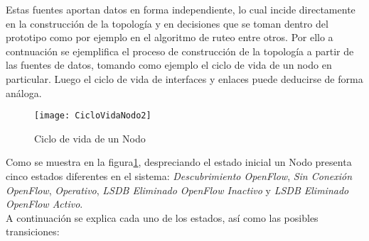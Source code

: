 Estas fuentes aportan datos en forma independiente, lo cual incide directamente en la construcci\'on de la topolog\'ia y en decisiones que se toman dentro del prototipo como por ejemplo en el algoritmo de ruteo entre otros. Por ello a contnuaci\'on se ejemplifica el proceso de construcci\'on de la topolog\'ia a partir de las fuentes de datos, tomando como ejemplo el ciclo de vida de un nodo en particular. Luego el ciclo de vida de interfaces y enlaces puede deducirse de forma análoga.\\

\begin{figure}[ht!] 
\centering    
\texttt{[image: CicloVidaNodo2]}
\caption[Ciclo de vida de un Nodo]{Ciclo de vida de un Nodo}
\label{fig:CicloVidaNodo}
\end{figure}
  
Como se muestra en la figura\ref{fig:CicloVidaNodo}, despreciando el estado inicial un Nodo presenta cinco estados diferentes en el sistema: \textit{Descubrimiento OpenFlow}, \textit{Sin Conexión OpenFlow}, \textit{Operativo}, \textit{LSDB Eliminado OpenFlow Inactivo} y \textit{LSDB Eliminado OpenFlow Activo}.\\

A continuación se explica cada uno de los estados, así como las posibles transiciones:

